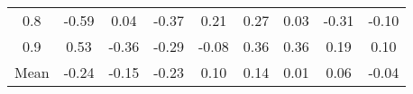 \begin{longtable}{ | c || c | c | c | c | c | c | c || c |}
0.8 &  \cellcolor[HTML]{FFEFEF} -0.59 &  \cellcolor[HTML]{FFFFFF} 0.04 &  \cellcolor[HTML]{FFF7F7} -0.37 &  \cellcolor[HTML]{F7F7FF} 0.21 &  \cellcolor[HTML]{F7F7FF} 0.27 &  \cellcolor[HTML]{FFFFFF} 0.03 &  \cellcolor[HTML]{FFF7F7} -0.31 &  \cellcolor[HTML]{FFFFFF} -0.10 \\
0.9 &  \cellcolor[HTML]{EFEFFF} 0.53 &  \cellcolor[HTML]{FFF7F7} -0.36 &  \cellcolor[HTML]{FFF7F7} -0.29 &  \cellcolor[HTML]{FFFFFF} -0.08 &  \cellcolor[HTML]{F7F7FF} 0.36 &  \cellcolor[HTML]{F7F7FF} 0.36 &  \cellcolor[HTML]{F7F7FF} 0.19 &  \cellcolor[HTML]{FFFFFF} 0.10 \\
\hline
\hline
Mean  &  \cellcolor[HTML]{FFF7F7} -0.24 &  \cellcolor[HTML]{FFFFFF} -0.15 &  \cellcolor[HTML]{FFF7F7} -0.23 &  \cellcolor[HTML]{FFFFFF} 0.10 &  \cellcolor[HTML]{FFFFFF} 0.14 &  \cellcolor[HTML]{FFFFFF} 0.01 &  \cellcolor[HTML]{FFFFFF} 0.06 &  \cellcolor[HTML]{FFFFFF} -0.04 \\
\hline
\end{longtable}
